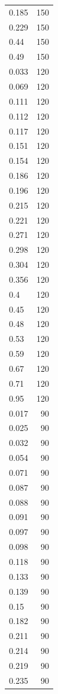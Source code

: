 \begin{table}[ht]
\begin{tabular}{lr}
  0.185 & 150 \\ 
  0.229 & 150 \\ 
  0.44 & 150 \\ 
  0.49 & 150 \\ 
  0.033 & 120 \\ 
  0.069 & 120 \\ 
  0.111 & 120 \\ 
  0.112 & 120 \\ 
  0.117 & 120 \\ 
  0.151 & 120 \\ 
  0.154 & 120 \\ 
  0.186 & 120 \\ 
  0.196 & 120 \\ 
  0.215 & 120 \\ 
  0.221 & 120 \\ 
  0.271 & 120 \\ 
  0.298 & 120 \\ 
  0.304 & 120 \\ 
  0.356 & 120 \\ 
  0.4 & 120 \\ 
  0.45 & 120 \\ 
  0.48 & 120 \\ 
  0.53 & 120 \\ 
  0.59 & 120 \\ 
  0.67 & 120 \\ 
  0.71 & 120 \\ 
  0.95 & 120 \\ 
  0.017 &  90 \\ 
  0.025 &  90 \\ 
  0.032 &  90 \\ 
  0.054 &  90 \\ 
  0.071 &  90 \\ 
  0.087 &  90 \\ 
  0.088 &  90 \\ 
  0.091 &  90 \\ 
  0.097 &  90 \\ 
  0.098 &  90 \\ 
  0.118 &  90 \\ 
  0.133 &  90 \\ 
  0.139 &  90 \\ 
  0.15 &  90 \\ 
  0.182 &  90 \\ 
  0.211 &  90 \\ 
  0.214 &  90 \\ 
  0.219 &  90 \\ 
  0.235 &  90 \\ 

\end{tabular}
\end{table}
